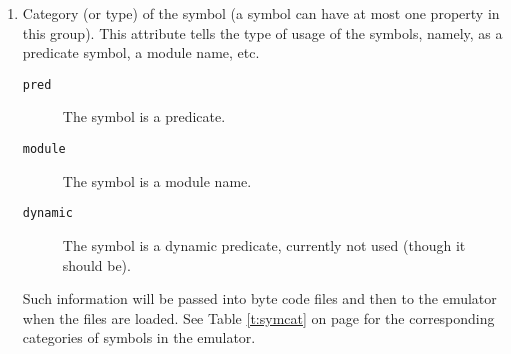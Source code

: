 \begin{enumerate}
\item	Category (or type) of the symbol (a symbol can have at most one
	property in this group). This attribute tells the type of usage
	of the symbols, namely, as a predicate symbol, a module name, etc.
	\begin{description}
	\item[{\tt pred}]	The symbol is a predicate.
	\item[{\tt module}]	The symbol is a module name.
	\item[{\tt dynamic}]	The symbol is a dynamic predicate, currently
				not used (though it should be).
	\end{description}
	Such information will be passed into byte code files and then to the
	emulator when the files are loaded. See Table \ref{t:symcat} on page
	\pageref{t:symcat} for the corresponding categories of symbols
	in the emulator.


\end{enumerate}
